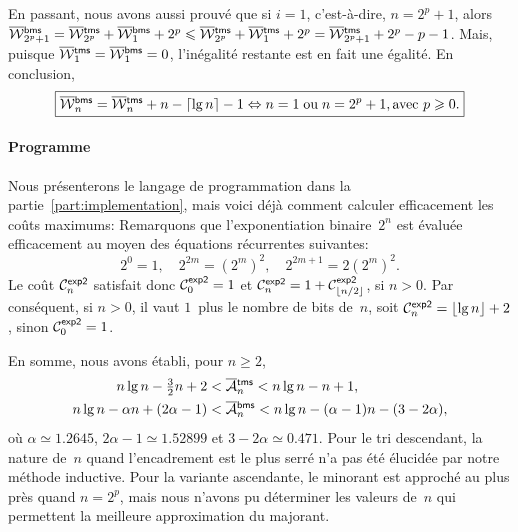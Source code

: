 En passant, nous avons aussi prouvé que si \(i=1\), c'est-à-dire,
\(n=2^p + 1\), alors \(\OW{\fun{bms}}{2^p+1} = \OW{\fun{tms}}{2^p} +
\OW{\fun{bms}}{1} + 2^p \leqslant \OW{\fun{tms}}{2^p} +
\OW{\fun{tms}}{1} + 2^p = \OW{\fun{tms}}{2^p+1} + 2^p - p - 1\). Mais,
puisque \(\OW{\fun{tms}}{1} = \OW{\fun{bms}}{1} = 0\), l'inégalité
restante est en fait une égalité. En conclusion,
\begin{equation*}
\boxed{\OW{\fun{bms}}{n} = \OW{\fun{tms}}{n} + n - \ceiling{\lg n} - 1
  \Leftrightarrow n=1 \;\text{ou}\; n=2^p+1, \text{avec \(p \geqslant
    0\)}.}
\end{equation*}

\paragraph{Programme}

Nous présenterons le langage de programmation \Erlang dans la
partie~\ref{part:implementation}, mais voici déjà comment calculer
efficacement les coûts maximums:  Remarquons
que l'exponentiation binaire~\(2^n\) est évaluée efficacement au moyen
des équations récurrentes suivantes:
\begin{equation*}
2^0 = 1,\quad 2^{2m} = (2^m)^2,\quad 2^{2m+1} =  2(2^m)^2.
\end{equation*}
Le coût \(\C{\fun{exp2}}{n}\) satisfait donc \(\C{\fun{exp2}}{0} = 1\)
et \(\C{\fun{exp2}}{n} = 1 + \C{\fun{exp2}}{\floor{n/2}}\), si \(n >
0\). Par conséquent, si \(n > 0\), il vaut \(1\)~plus le nombre de
bits de~\(n\), soit \(\C{\fun{exp2}}{n} = \floor{\lg n} + 2\), sinon
\(\C{\fun{exp2}}{0} = 1\).


En somme, nous avons établi, pour \(n \geqslant 2\),
\begin{align*}
n\lg n - \tfrac{3}{2}n + 2 &< \OM{\fun{tms}}{n} < n\lg n - n + 1,\\
n\lg n - \alpha n + (2\alpha - 1) &< \OM{\fun{bms}}{n}
< n\lg n - (\alpha - 1)n - (3 - 2\alpha),
\end{align*}
où \(\alpha \simeq 1.2645\), \(2\alpha - 1 \simeq 1.52899\) et \(3 -
2\alpha \simeq 0.471\). Pour le tri descendant, la nature de~\(n\)
quand l'encadrement est le plus serré n'a pas été élucidée par notre
méthode inductive. Pour la variante ascendante, le minorant est
approché au plus près quand \(n=2^p\), mais nous n'avons pu déterminer
les valeurs de~\(n\) qui permettent la meilleure approximation du
majorant.

